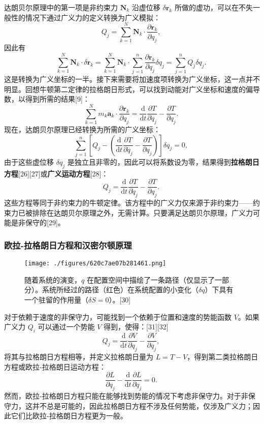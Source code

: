 达朗贝尔原理中的第一项是非约束力 \( \mathbf{N}_k \) 沿虚位移 \( \delta \mathbf{r}_k \) 所做的虚功，可以在不失一般性的情况下通过广义力的定义转换为广义模拟：
\[
Q_j = \sum_{k=1}^{N} \mathbf{N}_k \cdot \frac{\partial \mathbf{r}_k}{\partial q_j},~
\]
因此有
\[
\sum_{k=1}^{N} \mathbf{N}_k \cdot \delta \mathbf{r}_k = \sum_{k=1}^{N} \mathbf{N}_k \cdot \sum_{j=1}^{n} \frac{\partial \mathbf{r}_k}{\partial q_j} \delta q_j = \sum_{j=1}^{n} Q_j \delta q_j.~
\]
这是转换为广义坐标的一半。接下来需要将加速度项转换为广义坐标，这一点并不明显。回想牛顿第二定律的拉格朗日形式，可以找到动能对广义坐标和速度的偏导数，以得到所需的结果[9]：
\[
\sum_{k=1}^{N} m_k \mathbf{a}_k \cdot \frac{\partial \mathbf{r}_k}{\partial q_j} = \frac{\mathrm{d}}{\mathrm{d} t} \frac{\partial T}{\partial \dot{q}_j} - \frac{\partial T}{\partial q_j}.~
\]
现在，达朗贝尔原理已经转换为所需的广义坐标：
\[
\sum_{j=1}^{n}\left[Q_j - \left(\frac{\mathrm{d}}{\mathrm{d} t} \frac{\partial T}{\partial \dot{q}_j} - \frac{\partial T}{\partial q_j}\right)\right]\delta q_j = 0,~
\]
由于这些虚位移 \(\delta q_j\) 是独立且非零的，因此可以将系数设为零，结果得到\textbf{拉格朗日方程}[26][27]或\textbf{广义运动方程}[28]：
\[
Q_{j} = \frac{\mathrm{d}}{\mathrm{d} t} \frac{\partial T}{\partial \dot{q}_{j}} - \frac{\partial T}{\partial q_{j}}.~
\]
这些方程等同于非约束力的牛顿定律。该方程中的广义力仅来源于非约束力——约束力已被排除在达朗贝尔原理之外，无需计算。只要满足达朗贝尔原理，广义力可能是非保守的[29]。
\subsubsection{欧拉-拉格朗日方程和汉密尔顿原理}
\begin{figure}[ht]
\centering
\texttt{[image: ./figures/620c7ae07b281461.png]}
\caption{随着系统的演变，\( q \) 在配置空间中描绘了一条路径（仅显示了一部分）。系统所经过的路径（红色）在系统配置的小变化（\(\delta q\)）下具有一个驻留的作用量（\(\delta S = 0\)）。[30]} \label{fig_LGL_7}
\end{figure}
对于依赖于速度的非保守力，可能找到一个依赖于位置和速度的势能函数 \( V \)。如果广义力 \( Q_i \) 可以通过一个势能 \( V \) 得到，使得：[31][32]
\[
Q_{j} = \frac{\mathrm{d}}{\mathrm{d} t} \frac{\partial V}{\partial \dot{q}_{j}} - \frac{\partial V}{\partial q_{j}},~
\]
将其与拉格朗日方程相等，并定义拉格朗日量为 \( L = T - V \)，得到第二类拉格朗日方程或欧拉-拉格朗日运动方程：
\[
\frac{\partial L}{\partial q_{j}} - \frac{\mathrm{d}}{\mathrm{d} t} \frac{\partial L}{\partial \dot{q}_{j}} = 0.~
\]
然而，欧拉-拉格朗日方程只能在能够找到势能的情况下考虑非保守力。对于非保守力，这并不总是可能的，因此拉格朗日方程不涉及任何势能，仅涉及广义力；因此它们比欧拉-拉格朗日方程更为一般。


